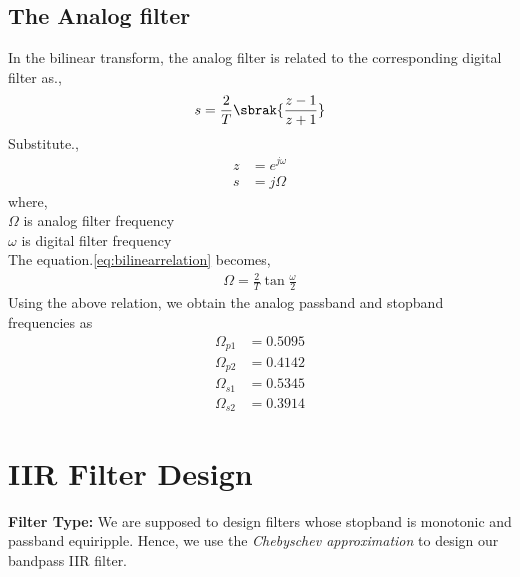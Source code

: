 \documentclass[journal,12pt,twocolumn]{IEEEtran}
\begin{document}
\subsection{The Analog filter}
In the bilinear transform, the analog filter is related to the corresponding digital filter as.,
\begin{align}
    s = \frac{2}{T}\sbrak{\frac{z-1}{z+1}} \label{eq:bilinearrelation}
\end{align}
Substitute.,
\begin{align}
    z &= e^{j\omega}\\
    s &= j\Omega
\end{align}
where,\\ $\Omega$ is analog filter frequency\\
$\omega$ is digital filter frequency\\
The equation.\ref{eq:bilinearrelation} becomes,
\begin{align}
    \Omega  = \frac{2}{T}\tan\frac{\omega}{2}
\end{align}
Using the above relation, we obtain the analog passband and stopband frequencies as
\begin{align}
    \Omega_{p1} &= 0.5095\\
    \Omega_{p2} &= 0.4142\\ \Omega_{s1} &= 0.5345\\ \Omega_{s2} &= 0.3914
\end{align}

\section{IIR Filter Design}
\textbf{Filter Type:} We are supposed to design filters whose stopband is monotonic and passband equiripple.  
Hence, we use the {\em Chebyschev approximation} to design our bandpass IIR filter.
\end{document}

